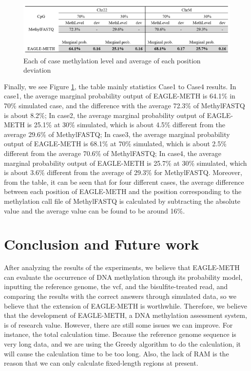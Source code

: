 \documentclass{PHlab-thesis}
\begin{document}
\begin{figure}[h]
  \centering
  \includegraphics[scale=0.8]{figures/result.PNG}
  \caption{Each of case methylation level and average of each position deviation}
  \label{re} 
\end{figure}

\par Finally, we see Figure \ref{re}, the table mainly statistics Case1 to Case4 results. In case1, the average marginal probability output of EAGLE-METH is 64.1\% in 70\% simulated case, and the difference with the average 72.3\% of MethylFASTQ is about 8.2\%; In case2, the average marginal probability output of EAGLE-METH is 25.1\% at 30\% simulated, which is about 4.5\% different from the average 29.6\% of MethylFASTQ;   In case3, the average marginal probability output of EAGLE-METH is 68.1\% at 70\% simulated, which is about 2.5\% different from the average 70.6\% of MethylFASTQ; In case4, the average marginal probability output of EAGLE-METH is 25.7\% at 30\% simulated, which is about 3.6\% different from the average of 29.3\% for MethylFASTQ.
Moreover, from the table, it can be seen that for four different cases, the average difference between each position of EAGLE-METH and the position corresponding to the methylation call file of MethylFASTQ is calculated by subtracting the absolute value and the average value can be found to be around 16\%.



\chapter{Conclusion and Future work}
After analyzing the results of the experiments, we believe that EAGLE-METH can evaluate the occurrence of DNA methylation through its probability model, inputting the reference genome, the vcf, and the bisulfite-treated read, and comparing the results with the correct answers through simulated data, so we believe that the extension of EAGLE-METH is worthwhile. Therefore, we believe that the development of EAGLE-METH, a DNA methylation assessment system, is of research value. However, there are still some issues we can improve. For instance, the total calculation time. Because the reference genome sequence is very long data, and we are using the Greedy algorithm to do the calculation, it will cause the calculation time to be too long. Also, the lack of RAM is the reason that we can only calculate fixed-length regions at present.

\newpage
{}
\printbibliography
\end{document}
